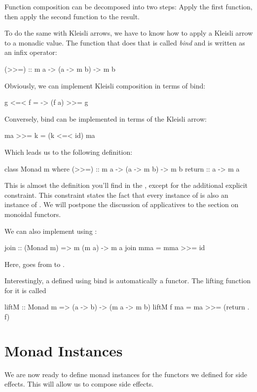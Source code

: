 \documentclass[DaoFP]{subfiles}
\begin{document}
Function composition can be decomposed into two steps: Apply the first function, then apply the second function to the result. 

To do the same with Kleisli arrows, we have to know how to apply a Kleisli arrow to a monadic value. The function that does that is called \emph{bind} and is written as an infix operator:
\begin{haskell}
(>>=) :: m a -> (a -> m b) -> m b
\end{haskell}
Obviously, we can implement Kleisli composition in terms of bind:

\begin{haskell}
g <=< f = \a -> (f a) >>= g
\end{haskell}

Conversely, bind can be implemented in terms of the Kleisli arrow:
\begin{haskell}
ma >>= k = (k <=< id) ma
\end{haskell}
Which leads us to the following definition:
\begin{haskell}
class Monad m where
  (>>=) :: m a -> (a -> m b) -> m b
  return :: a -> m a 
\end{haskell}
This is almost the definition you'll find in the , except for the additional explicit constraint. This constraint states the fact that every instance of  is also an instance of . We will postpone the discussion of applicatives to the section on monoidal functors.

We can also implement  using \hask{>>=}:
\begin{haskell}
join  :: (Monad m) => m (m a) -> m a
join mma =  mma >>= id
\end{haskell}
Here,  goes from  to .

Interestingly, a  defined using bind is automatically a functor. The lifting function for it is called 
\begin{haskell}
liftM :: Monad m => (a -> b) -> (m a -> m b)
liftM f ma = ma >>= (return . f)
\end{haskell}

\section{Monad Instances}

We are now ready to define monad instances for the functors we defined for side effects. This will allow us to compose side effects.
\end{document}
